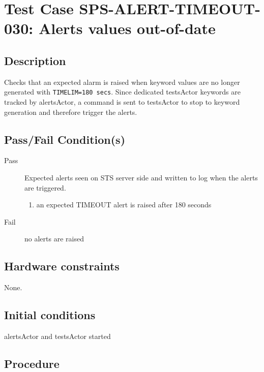 \section{Test Case SPS-ALERT-TIMEOUT-030: Alerts values out-of-date}

\subsection{Description}

Checks that an expected alarm is raised when keyword values are no longer generated 
with \texttt{TIMELIM=180 secs}.
Since dedicated testsActor keywords are tracked by alertsActor,
a command is sent to testsActor to stop to keyword generation and therefore trigger the alerts.

\subsection{Pass/Fail Condition(s)}

\begin{description}
\item [Pass] Expected alerts seen on STS server side and written to log when the alerts are triggered.

\begin{enumerate}
    \item  an expected TIMEOUT alert is raised after 180 seconds

\end{enumerate}
\item [Fail] no alerts are raised

\end{description}

\subsection{Hardware constraints}

None.

\subsection{Initial conditions}

alertsActor and testsActor started

\subsection{Procedure}
\label{sec:alerts-proc}

